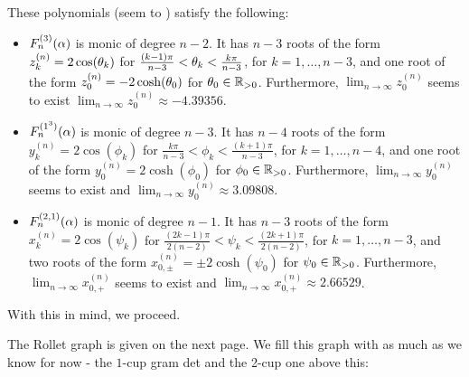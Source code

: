 {These polynomials (seem to  ) satisfy the following:
\begin{itemize}
    \item $F^{(3)}_{n}(\alpha)$ is monic of degree $n-2$. It has $n-3$ roots of the form $z_k^{(n)}=2\cos (\theta_k)$ for $\frac{(k-1)\pi }{n-3}<\theta_k<\frac{k\pi }{n-3}$, for $k=1,\dots, n-3$, and one root of the form $z_0^{(n)}=-2 \cosh(\theta_0)$ for $\theta_0\in \mathbb{R}_{>0}$. Furthermore, $\lim_{n\to \infty} z_0^{(n)}$ seems to exist
    $\lim_{n\to \infty} z_0^{(n)}\approx -4.39356$.
    \item $F^{(1^3)}_{n}(\alpha)$ is monic of degree $n-3$. It has $n-4$ roots of the form $y_k^{(n)}=2\cos (\phi_k)$ for $\frac{k\pi }{n-3}<\phi_k<\frac{(k+1)\pi }{n-3}$, for $k=1,\dots, n-4$, and one root of the form $y_0^{(n)}=2 \cosh(\phi_0)$ for $\phi_0\in \mathbb{R}_{>0}$. Furthermore, $\lim_{n\to \infty} y_0^{(n)}$ seems to exist and $\lim_{n\to \infty} y_0^{(n)}\approx 3.09808$.
    \item $F^{(2,1)}_{n}(\alpha)$ is monic of degree $n-1$. It has $n-3$ roots of the form $x_k^{(n)}=2\cos (\psi_k)$ for $\frac{(2k-1)\pi }{2(n-2)}<\psi_k<\frac{(2k+1)\pi }{2(n-2)}$, for $k=1,\dots, n-3$, and two roots of the form $x_{0,\pm}^{(n)}=\pm 2 \cosh(\psi_0)$ for $\psi_0\in \mathbb{R}_{>0}$. Furthermore, $\lim_{n\to \infty} x_{0,+}^{(n)}$ seems to exist and $\lim_{n\to \infty} x_{0,+}^{(n)}\approx 2.66529$.
\end{itemize}
With this in mind, we proceed. 

\mdef 
The Rollet graph  is given on the next page. 
We fill this graph with as much as we know for now - the $1$-cup gram det and the 2-cup one above this:
}

